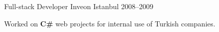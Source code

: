 \begin{cventries}
  \cventry
    {Full-stack Developer} %
    {Inveon} %
    {Istanbul} %
    {2008--2009} %
    {
      \begin{cvitems} %
        \item {Worked on \textbf{C\#} web projects for internal use of Turkish companies.}
      \end{cvitems}
    }
    {}
\end{cventries}
